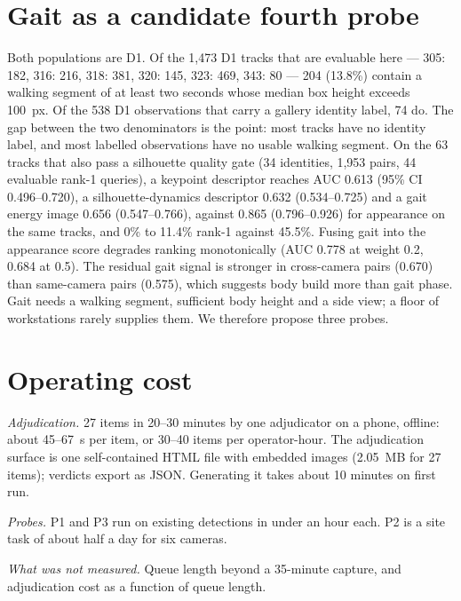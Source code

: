 \documentclass[10pt,a4paper]{article}
\begin{document}
\section{Gait as a candidate fourth probe}
Both populations are D1. Of the 1,473 D1 tracks that are evaluable here --- 305: 182, 316: 216, 318: 381, 320: 145, 323: 469, 343: 80 --- 204 (13.8\%) contain a walking segment of at least two seconds whose median box height exceeds 100~px. Of the 538 D1 observations that carry a gallery identity label, 74 do. The gap between the two denominators is the point: most tracks have no identity label, and most labelled observations have no usable walking segment. On the 63 tracks that also pass a silhouette quality gate (34 identities, 1,953 pairs, 44 evaluable rank-1 queries), a keypoint descriptor reaches AUC 0.613 (95\% CI 0.496--0.720), a silhouette-dynamics descriptor 0.632 (0.534--0.725) and a gait energy image 0.656 (0.547--0.766), against 0.865 (0.796--0.926) for appearance on the same tracks, and 0\% to 11.4\% rank-1 against 45.5\%. Fusing gait into the appearance score degrades ranking monotonically (AUC 0.778 at weight 0.2, 0.684 at 0.5). The residual gait signal is stronger in cross-camera pairs (0.670) than same-camera pairs (0.575), which suggests body build more than gait phase. Gait needs a walking segment, sufficient body height and a side view; a floor of workstations rarely supplies them. We therefore propose three probes.

\section{Operating cost}
\emph{Adjudication.} 27 items in 20--30 minutes by one adjudicator on a phone, offline: about 45--67~s per item, or 30--40 items per operator-hour. The adjudication surface is one self-contained HTML file with embedded images (2.05~MB for 27 items); verdicts export as JSON. Generating it takes about 10 minutes on first run.

\emph{Probes.} P1 and P3 run on existing detections in under an hour each. P2 is a site task of about half a day for six cameras.

\emph{What was not measured.} Queue length beyond a 35-minute capture, and adjudication cost as a function of queue length.
\end{document}
